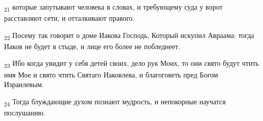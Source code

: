 \begin{tcolorbox}
\textsubscript{21} которые запутывают человека в словах, и требующему суда у ворот расставляют сети, и отталкивают правого.
\end{tcolorbox}
\begin{tcolorbox}
\textsubscript{22} Посему так говорит о доме Иакова Господь, Который искупил Авраама: тогда Иаков не будет в стыде, и лице его более не побледнеет.
\end{tcolorbox}
\begin{tcolorbox}
\textsubscript{23} Ибо когда увидит у себя детей своих, дело рук Моих, то они свято будут чтить имя Мое и свято чтить Святаго Иаковлева, и благоговеть пред Богом Израилевым.
\end{tcolorbox}
\begin{tcolorbox}
\textsubscript{24} Тогда блуждающие духом познают мудрость, и непокорные научатся послушанию.
\end{tcolorbox}
